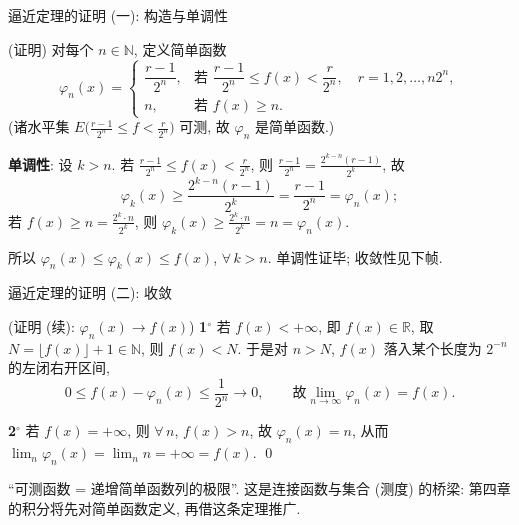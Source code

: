 \begin{frame}{逼近定理的证明 (一): 构造与单调性}

\startproof[bg=yellow, fg=red](证明)
对每个 $n \in \mathbb{N}$, 定义简单函数
\[
\varphi_n(x) =
\begin{cases}
\dfrac{r-1}{2^n}, & \text{若 } \dfrac{r-1}{2^n} \leqslant f(x) < \dfrac{r}{2^n}, \quad r = 1, 2, \ldots, n2^n, \\[2mm]
n, & \text{若 } f(x) \geqslant n.
\end{cases}
\]
(诸水平集 $E\big(\frac{r-1}{2^n} \leqslant f < \frac{r}{2^n}\big)$ 可测, 故 $\varphi_n$ 是简单函数.)

\pause

\textbf{单调性}: 设 $k > n$.
若 $\frac{r-1}{2^n} \leqslant f(x) < \frac{r}{2^n}$, 则 $\frac{r-1}{2^n} = \frac{2^{k-n}(r-1)}{2^k}$, 故
\[
\varphi_k(x) \geqslant \frac{2^{k-n}(r-1)}{2^k} = \frac{r-1}{2^n} = \varphi_n(x);
\]
若 $f(x) \geqslant n = \frac{2^k \cdot n}{2^k}$, 则 $\varphi_k(x) \geqslant \frac{2^k \cdot n}{2^k} = n = \varphi_n(x)$.

所以 $\varphi_n(x) \leqslant \varphi_k(x) \leqslant f(x)$, $\forall\, k > n$. 单调性证毕; 收敛性见下帧.

\end{frame}


\begin{frame}{逼近定理的证明 (二): 收敛}

\startproof[bg=yellow, fg=red](证明 (续): $\varphi_n(x) \to f(x)$)
\textbf{1$^\circ$} 若 $f(x) < +\infty$, 即 $f(x) \in \mathbb{R}$, 取 $N = \lfloor f(x) \rfloor + 1 \in \mathbb{N}$, 则 $f(x) < N$. 于是对 $n > N$, $f(x)$ 落入某个长度为 $2^{-n}$ 的左闭右开区间,
\[
0 \leqslant f(x) - \varphi_n(x) \leqslant \frac{1}{2^n} \longrightarrow 0,
\qquad \text{故} \lim_{n \to \infty} \varphi_n(x) = f(x).
\]

\pause

\textbf{2$^\circ$} 若 $f(x) = +\infty$, 则 $\forall\, n$, $f(x) > n$, 故 $\varphi_n(x) = n$, 从而 $\lim_n \varphi_n(x) = \lim_n n = +\infty = f(x)$.
\qed

\pause

\begin{attnblock}
``可测函数 = 递增简单函数列的极限''. 这是连接函数与集合 (测度) 的桥梁: 第四章的积分将\alert{先对简单函数定义}, 再借这条定理推广.
\end{attnblock}

\end{frame}

